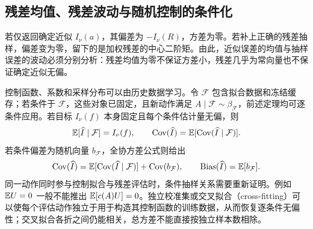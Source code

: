 \subsection{残差均值、残差波动与随机控制的条件化}

若仅返回确定近似 $I_\nu(a)$，其偏差为 $-I_\nu(R)$，方差为零。若补上正确的残差抽样，偏差变为零，留下的是加权残差的中心二阶矩。由此，近似误差的均值与抽样误差的波动必须分别分析：残差均值为零不保证方差小，残差几乎为常向量也不保证确定近似无偏。

控制函数、系数和采样分布可以由历史数据学习。令 $\mathcal F$ 包含拟合数据和冻结缓存；若条件于 $\mathcal F$，这些对象已固定，且新动作满足 $A\mid\mathcal F\sim\beta_{\mathcal F}$，前述定理均可逐条件应用。若目标 $I_\nu(f)$ 本身固定且每个条件估计量无偏，则
\begin{equation*}
 \mathbb E[\widehat I\mid\mathcal F]=I_\nu(f),\qquad
 \operatorname{Cov}(\widehat I)=\mathbb E[\operatorname{Cov}(\widehat I\mid\mathcal F)].
\end{equation*}
若条件偏差为随机向量 $b_{\mathcal F}$，全协方差公式则给出
\begin{equation*}
 \operatorname{Cov}(\widehat I)
 =\mathbb E[\operatorname{Cov}(\widehat I\mid\mathcal F)]+\operatorname{Cov}(b_{\mathcal F}),
 \qquad \operatorname{Bias}(\widehat I)=\mathbb E[b_{\mathcal F}].
\end{equation*}
同一动作同时参与控制拟合与残差评估时，条件抽样关系需要重新证明。例如 $\mathbb E U=0$ 一般不能推出 $\mathbb E[c(A)U]=0$。独立校准集或交叉拟合（cross-fitting）可以使每个评估动作独立于用于构造其控制函数的训练数据，从而恢复逐条件无偏性；交叉拟合各折之间仍能相关，总方差不能直接按独立样本数相除。
